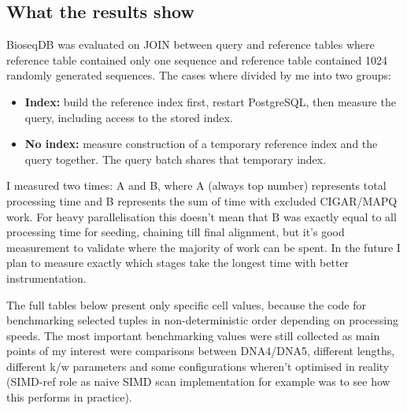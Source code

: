 \begingroup
\raggedbottom
\subsection{What the results show}
\label{sec:benchmark-interpretation}

BioseqDB was evaluated on JOIN between query and reference tables where reference table contained only one sequence and reference table contained 1024 randomly generated sequences.
The cases where divided by me into two groups:
\begin{itemize}
  \item \textbf{Index:} build the reference index first, restart PostgreSQL,
  then measure the query, including access to the stored index.
  \item \textbf{No index:} measure construction of a temporary reference index
  and the query together. The query batch shares that temporary index.
\end{itemize}

I measured two times: A and B, where A (always top number) represents total processing time and B represents the sum of time with excluded CIGAR/MAPQ work.
For heavy parallelisation this doesn't mean that B was exactly equal to all processing time for seeding, chaining till final alignment, but it's good measurement to validate where the majority of work can be spent.
In the future I plan to measure exactly which stages take the longest time with better instrumentation.

The full tables below present only specific cell values, because the code for benchmarking selected tuples in non-deterministic order depending on processing speeds.
The most important benchmarking values were still collected as main points of my interest were comparisons between DNA4/DNA5, different lengths, different k/w parameters and some 
configurations wheren't optimised in reality (SIMD-ref role as naive SIMD scan implementation for example was to see how this performs in practice).

